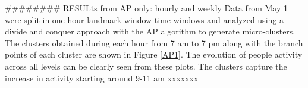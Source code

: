 ######## RESULts from AP only: hourly and weekly
Data from May 1 were split in one hour landmark window time windows and analyzed using a divide and conquer approach with the AP algorithm to generate micro-clusters. The clusters obtained during each hour from 7 am to 7 pm along with the branch points of each cluster are shown in Figure \ref{AP1}. The evolution of people activity across all levels can be clearly seen from these plots. The clusters capture the increase in activity starting around 9-11 am xxxxxxx





